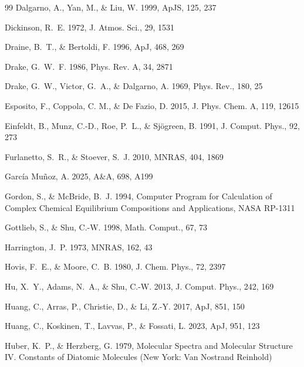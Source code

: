 \begin{thebibliography}{99}
Dalgarno, A., Yan, M., \& Liu, W. 1999, ApJS, 125, 237

Dickinson, R.~E. 1972, J. Atmos. Sci., 29, 1531

Draine, B.~T., \& Bertoldi, F. 1996, ApJ, 468, 269

Drake, G.~W.~F. 1986, Phys. Rev. A, 34, 2871

Drake, G.~W., Victor, G.~A., \& Dalgarno, A. 1969, Phys. Rev., 180, 25

Esposito, F., Coppola, C. M., \& De Fazio, D. 2015, J. Phys. Chem. A, 119, 12615

Einfeldt, B., Munz, C.-D., Roe, P.~L., \& Sj\"ogreen, B. 1991,
J. Comput. Phys., 92, 273

Furlanetto, S.~R., \& Stoever, S.~J. 2010, MNRAS, 404, 1869

Garc\'ia Mu\~noz, A. 2025, A\&A, 698, A199

Gordon, S., \& McBride, B.~J. 1994, Computer Program for Calculation of
Complex Chemical Equilibrium Compositions and Applications, NASA RP-1311

Gottlieb, S., \& Shu, C.-W. 1998, Math. Comput., 67, 73

Harrington, J.~P. 1973, MNRAS, 162, 43

Hovis, F.~E., \& Moore, C.~B. 1980, J. Chem. Phys., 72, 2397

Hu, X.~Y., Adams, N.~A., \& Shu, C.-W. 2013, J. Comput. Phys., 242, 169

Huang, C., Arras, P., Christie, D., \& Li, Z.-Y. 2017, ApJ, 851, 150

Huang, C., Koskinen, T., Lavvas, P., \& Fossati, L. 2023, ApJ, 951, 123

Huber, K.~P., \& Herzberg, G. 1979, Molecular Spectra and Molecular
Structure IV. Constants of Diatomic Molecules (New York: Van Nostrand
Reinhold)


\end{thebibliography}

